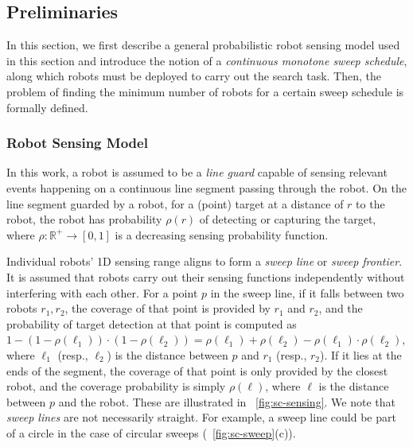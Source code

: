
\subsection{Preliminaries}

In this section, we first describe a general probabilistic robot sensing model 
used in this section and introduce the notion of a \emph{continuous monotone 
sweep schedule}, along which robots must be deployed to carry out the 
search task. 
%
Then, the problem of finding the minimum number of robots for a certain 
sweep schedule is formally defined.

\subsubsection{Robot Sensing Model}
\label{sec:sc-sensing}

In this work, a robot is assumed to be a \emph{line guard} capable of sensing 
relevant events happening on a continuous line segment passing through the
robot. 
%
On the line segment guarded by a robot, for a (point) target at a distance 
of $r$ to the robot, the robot has probability $\rho(r)$ of 
detecting or capturing the target, where $\rho: \mathbb{R}^+\rightarrow[0,1]$ 
is a decreasing sensing probability function. 
%

Individual robots' 1D sensing range aligns to form a \emph{sweep line} or \emph{sweep frontier}.
%
It is assumed that robots carry out their sensing functions independently 
without interfering with each other.
%
For a point $p$ in the sweep line, if it falls between two robots $r_1, r_2$, 
the coverage of that point is provided by $r_1$ and $r_2$, and the 
probability of target detection at that point is computed as $1-(1-\rho(\ell_1))\cdot(1-\rho(\ell_2))=\rho(\ell_1) + \rho(\ell_2) - \rho(\ell_1) \cdot \rho(\ell_2)$, 
where $\ell_1$ (resp., $\ell_2$) is the distance between $p$ and $r_1$ (resp., $r_2$).
%
If it lies at the ends of the segment, the coverage of that point is only provided by the closest robot, 
and the coverage probability is simply $\rho(\ell)$, where $\ell$ is the distance between $p$ and the robot. 
These are illustrated in ~\ref{fig:sc-sensing}.
%
We note that \emph{sweep lines} are not necessarily straight. 
For example, a sweep line could be part of a circle in the case of circular sweeps (~\ref{fig:sc-sweep}(c)).

